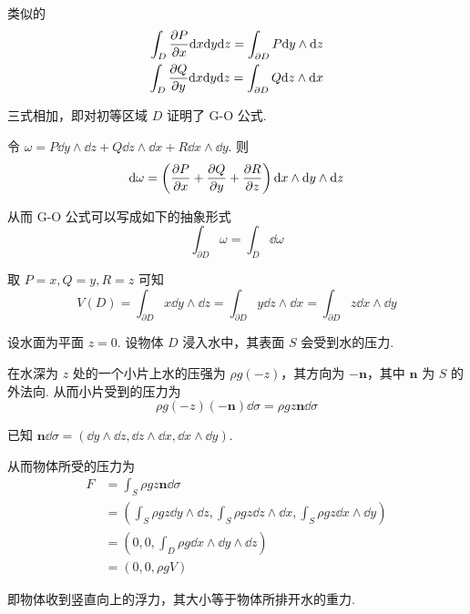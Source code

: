 类似的
$$
\begin{aligned}
    \int_D\frac{\partial{P}}{\partial{x}}\mathrm{d} x\mathrm{d} y\mathrm{d} z=\int_{\partial D}P\mathrm{d} y\wedge\mathrm{d} z\\
    \int_D\frac{\partial{Q}}{\partial{y}}\mathrm{d} x\mathrm{d} y\mathrm{d} z=\int_{\partial D}Q\mathrm{d} z\wedge\mathrm{d} x
\end{aligned}
$$

三式相加，即对初等区域 $D$ 证明了 G-O 公式.

\begin{hint}
    令 $\omega=P\dd y\wedge\dd z+Q\dd z\wedge\dd x+R\dd x\wedge\dd y$. 则
$$
\mathrm{d}\omega=\left(\frac{\partial{P}}{\partial{x}}+\frac{\partial{Q}}{\partial{y}}+\frac{\partial{R}}{\partial{z}}\right)\mathrm{d} x\wedge\mathrm{d} y\wedge\mathrm{d} z
$$

    从而 G-O 公式可以写成如下的抽象形式
$$
\int_{\partial D}\omega=\int_{\overline{D}}\dd\omega
$$
\end{hint}

\begin{example}
    取 $P=x,Q=y,R=z$ 可知
$$
V(D)=\int_{\partial D}x\dd y\wedge\dd z=\int_{\partial D}y\dd z\wedge\dd x=\int_{\partial D}z\dd x\wedge\dd y
$$
\end{example}

\begin{example}[ 椭球的体积]
\end{example}

\begin{example}
    设水面为平面 $z=0$. 设物体 $D$ 浸入水中，其表面 $S$ 会受到水的压力.


    在水深为 $z$ 处的一个小片上水的压强为 $\rho g(-z)$，其方向为 $-\mathbf{n}$，其中 $\mathbf{n}$ 为 $S$ 的外法向. 从而小片受到的压力为
$$
\rho g(-z)(-\mathbf{n})\dd\sigma=\rho gz\mathbf{n}\dd\sigma
$$

    已知 $\mathbf{n}\dd\sigma=(\dd y\wedge\dd z,\dd z\wedge\dd x,\dd x\wedge\dd y)$.

    从而物体所受的压力为
$$
\begin{aligned}
    F&=\int_S\rho g z\mathbf{n}\dd\sigma\\
    &=\left(\int_S\rho g z\dd y\wedge\dd z,\int_S\rho g z\dd z\wedge\dd x,\int_S\rho g z\dd x\wedge\dd y\right)\\
    &=\left(0,0,\int_D\rho g\dd x\wedge\dd y\wedge\dd z\right)\\
    &=(0,0,\rho g V)
\end{aligned}
$$

    即物体收到竖直向上的浮力，其大小等于物体所排开水的重力.
\end{example}

